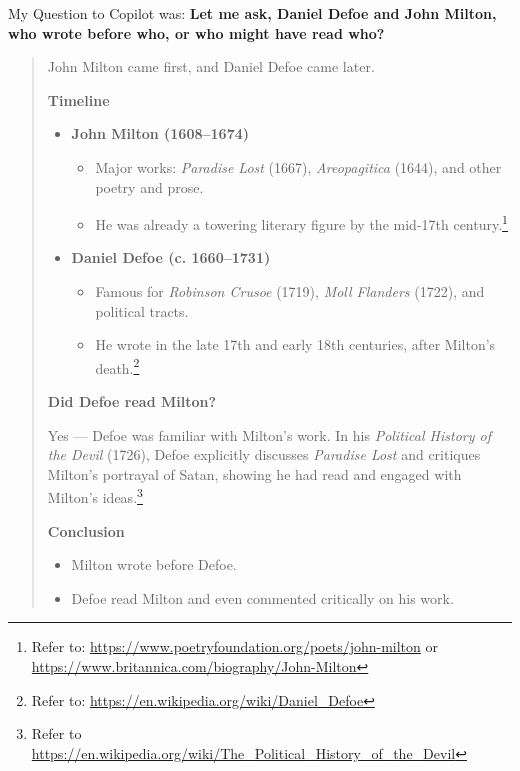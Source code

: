 \documentclass[a4paper]{article}
\begin{document}
My Question to Copilot was: \textbf{Let me ask, Daniel Defoe and John Milton, who wrote before who, or who might have read who?}

\noindent
\begin{minipage}{1\textwidth}
\vspace{1em}
\begin{quotation}
{\ttfamily


John Milton came first, and Daniel Defoe came later.  

\textbf{Timeline}
\begin{itemize}
\item{ \textbf{John Milton (1608–1674)}

\begin{itemize}
\item Major works: \textit{Paradise Lost} (1667), \textit{Areopagitica} (1644), and other poetry and prose.
\item He was already a towering literary figure by the mid‑17th century.\footnote{Refer to: \url{https://www.poetryfoundation.org/poets/john-milton} or \\ \url{https://www.britannica.com/biography/John-Milton}}
\end{itemize}

}

\item{ \textbf{Daniel Defoe (c. 1660–1731)}

\begin{itemize}
\item Famous for \textit{Robinson Crusoe} (1719), \textit{Moll Flanders} (1722), and political tracts. 
\item He wrote in the late 17th and early 18th centuries, after Milton’s death.\footnote{Refer to: \url{https://en.wikipedia.org/wiki/Daniel_Defoe}}
\end{itemize}

}

\end{itemize}
 

\textbf{Did Defoe read Milton?}

Yes — Defoe was familiar with Milton’s work. In his \textit{Political History of the Devil} (1726), Defoe explicitly discusses \textit{Paradise Lost} and critiques Milton’s portrayal of Satan, showing he had read and engaged with Milton’s ideas.\footnote{Refer to \url{https://en.wikipedia.org/wiki/The_Political_History_of_the_Devil}}

\textbf{Conclusion}

\begin{itemize}
\item Milton wrote before Defoe.
\item Defoe read Milton and even commented critically on his work.  
\end{itemize}

}
\end{quotation}
\end{minipage}
\end{document}
